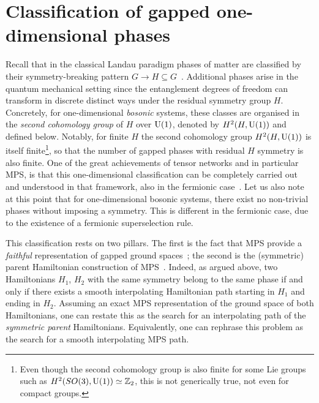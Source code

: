 \section{Classification of gapped one-dimensional phases}\label{sec:1Dphases}
Recall that in the classical Landau paradigm phases of matter are classified by their symmetry-breaking pattern $G\rightarrow H\subseteq G$~\cite{Landau1937,Chen2025}. Additional phases arise in the quantum mechanical setting since the entanglement degrees of freedom can transform in discrete distinct ways under the residual symmetry group $H$. Concretely, for one-dimensional \emph{bosonic} systems, these classes are organised in the \emph{second cohomology group} of $H$ over ${\rm U}(1)$, denoted by $H^2(H,{\rm U}(1))$ and defined below. Notably, for finite $H$ the second cohomology group $H^2(H,{\rm U}(1))$ is itself finite\footnote{Even though the second cohomology group is also finite for some Lie groups such as $H^2(SO(3),{\rm U}(1))\simeq\mathbb Z_2$, this is not generically true, not even for compact groups.}, so that the number of gapped phases with residual $H$ symmetry is also finite. One of the great achievements of tensor networks and in particular MPS, is that this one-dimensional classification can be completely carried out and understood in that framework, also in the fermionic case~\cite{Chen2010,Schuch2011,Bultinck2016}. Let us also note at this point that for one-dimensional bosonic systems, there exist no non-trivial phases without imposing a symmetry. This is different in the fermionic case, due to the existence of a fermionic superselection rule.

\bigskip\noindent This classification rests on two pillars. The first is the fact that MPS provide a \emph{faithful} representation of gapped ground spaces~\cite{Verstraete2006a}; the second is the (symmetric) parent Hamiltonian construction of MPS~\cite{Cirac2020}. Indeed, as argued above, two Hamiltonians $H_1$, $H_2$ with the same symmetry belong to the same phase if and only if there exists a smooth interpolating Hamiltonian path starting in $H_1$ and ending in $H_2$. Assuming an exact MPS representation of the ground space of both Hamiltonians, one can restate this as the search for an interpolating path of the \emph{symmetric parent} Hamiltonians. Equivalently, one can rephrase this problem as the search for a smooth interpolating MPS path.

